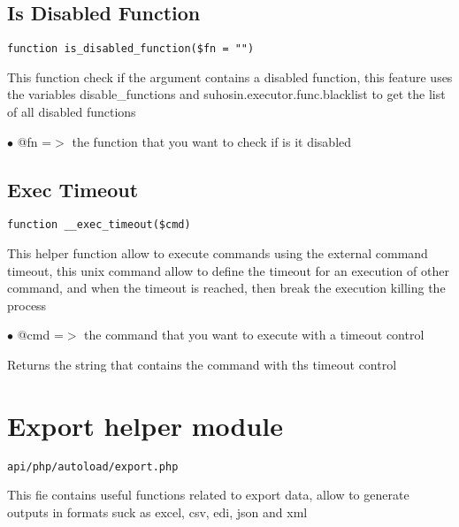\documentclass[a4paper]{book}
\begin{document}
\hypertarget{toc117}{}
\subsection{Is Disabled Function}

\begin{lstlisting}
function is_disabled_function($fn = "")
\end{lstlisting}

This function check if the argument contains a disabled
function, this feature uses the variables disable\_functions
and suhosin.executor.func.blacklist to get the list of all
disabled functions

\begin{compactitem}
\item[\color{myblue}$\bullet$] @fn =$>$ the function that you want to check if is it disabled
\end{compactitem}

\hypertarget{toc118}{}
\subsection{Exec Timeout}

\begin{lstlisting}
function __exec_timeout($cmd)
\end{lstlisting}

This helper function allow to execute commands using the external
command timeout, this unix command allow to define the timeout for
an execution of other command, and when the timeout is reached, then
break the execution killing the process

\begin{compactitem}
\item[\color{myblue}$\bullet$] @cmd =$>$ the command that you want to execute with a timeout control
\end{compactitem}

Returns the string that contains the command with ths timeout control

\hypertarget{toc119}{}
\section{Export helper module}

\begin{lstlisting}
api/php/autoload/export.php
\end{lstlisting}

This fie contains useful functions related to export data, allow to generate outputs in formats
suck as excel, csv, edi, json and xml
\end{document}

